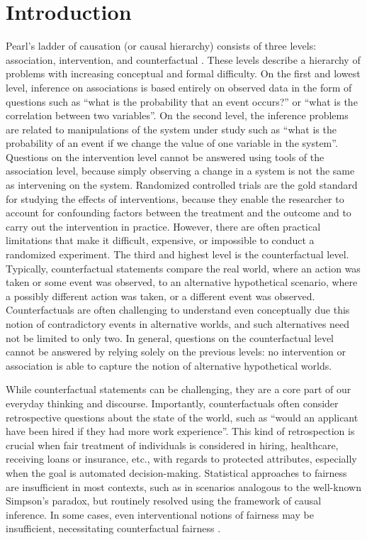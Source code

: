 \section{Introduction} \label{sec:intro}

Pearl's ladder of causation (or causal hierarchy) consists of three levels: association, intervention, and counterfactual \citep{pearl2009}. These levels describe a hierarchy of problems with increasing conceptual and formal difficulty. On the first and lowest level, inference on associations is based entirely on observed data in the form of questions such as ``what is the probability that an event occurs?'' or ``what is the correlation between two variables''. On the second level, the inference problems are related to manipulations of the system under study such as ``what is the probability of an event if we change the value of one variable in the system''. Questions on the intervention level cannot be answered using tools of the association level, because simply observing a change in a system is not the same as intervening on the system. Randomized controlled trials are the gold standard for studying the effects of interventions, because they enable the researcher to account for confounding factors between the treatment and the outcome and to carry out the intervention in practice. However, there are often practical limitations that make it difficult, expensive, or impossible to conduct a randomized experiment. The third and highest level is the counterfactual level. Typically, counterfactual statements compare the real world, where an action was taken or some event was observed, to an alternative hypothetical scenario, where a possibly different action was taken, or a different event was observed. Counterfactuals are often challenging to understand even conceptually due this notion of contradictory events in alternative worlds, and such alternatives need not be limited to only two. In general, questions on the counterfactual level cannot be answered by relying solely on the previous levels: no intervention or association is able to capture the notion of alternative hypothetical worlds.

While counterfactual statements can be challenging, they are a core part of our everyday thinking and discourse. Importantly, counterfactuals often consider retrospective questions about the state of the world, such as ``would an applicant have been hired if they had more work experience''. This kind of retrospection is crucial when fair treatment of individuals is considered in hiring, healthcare, receiving loans or insurance, etc., with regards to protected attributes, especially when the goal is automated decision-making. Statistical approaches to fairness are insufficient in most contexts, such as in scenarios analogous to the well-known Simpson's paradox, but routinely resolved using the framework of causal inference. In some cases, even interventional notions of fairness may be insufficient, necessitating counterfactual fairness \citep{KusnerCounterfactual, ZhangBareinboim2018}.


